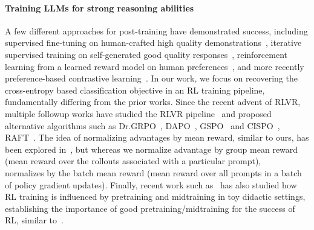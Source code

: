 \documentclass[10pt]{article} %
\begin{document}
\paragraph{Training LLMs for strong reasoning abilities} A few different approaches for post-training have demonstrated success, including supervised fine-tuning on human-crafted high quality demonstrations~\citep{wang2023farcamelsgoexploring}, iterative supervised training on self-generated good quality responses~\citep{zelikman2022starbootstrappingreasoningreasoning,gulcehre2023reinforcedselftrainingrestlanguage}, reinforcement learning from a learned reward model on human preferences~\citep{ouyang2022traininglanguagemodelsfollow}, and more recently preference-based contrastive learning~\citep{rafailov2024directpreferenceoptimizationlanguage,pang2024iterativereasoningpreferenceoptimization}. In our work, we focus on recovering the cross-entropy based classification objective in an RL training pipeline, fundamentally differing from the prior works. Since the recent advent of RLVR, multiple followup works have studied the RLVR pipeline~\citep{zeng2025simplerlzooinvestigatingtamingzero,liu2025understandingr1zeroliketrainingcritical,khatri2025artscalingreinforcementlearning} and proposed alternative algorithms such as Dr.GRPO~\citep{liu2025understandingr1zeroliketrainingcritical}, DAPO~\citep{yu2025dapoopensourcellmreinforcement}, GSPO~\citep{zheng2025groupsequencepolicyoptimization} and CISPO~\citep{minimax2025minimaxm1scalingtesttimecompute}, RAFT~\citep{xiong2025minimalistapproachllmreasoning}. The idea of normalizing advantages by mean reward, similar to ours, has been explored in~\citep{huang2025mapomixedadvantagepolicy}, but whereas we normalize advantage by group mean reward (mean reward over the rollouts associated with a particular prompt), ~\citet{huang2025mapomixedadvantagepolicy} normalizes by the batch mean reward (mean reward over all prompts in a batch of policy gradient updates). Finally, recent work such as~\citet{zhang2025interplaypretrainingmidtrainingrl} has also studied how RL training is influenced by pretraining and midtraining in toy didactic settings, establishing the importance of good pretraining/midtraining for the success of RL, similar to~\citet{gandhi2025cognitivebehaviorsenableselfimproving}.
\end{document}
